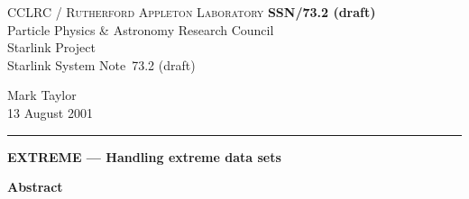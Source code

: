 \documentclass[twoside,11pt]{article}
\newcommand{\stardoccategory}  {Starlink System Note}
\newcommand{\stardocinitials}  {SSN}
\newcommand{\stardocnumber}    {73.2 (draft)}
\newcommand{\stardocauthors}   {Mark Taylor}
\newcommand{\stardocdate}      {13 August 2001}
\newcommand{\stardoctitle}     {EXTREME --- Handling extreme data sets}
\newcommand{\stardocname}{\stardocinitials /\stardocnumber}
\newenvironment{latexonly}{}{}
\renewcommand{\_}{\texttt{\symbol{95}}}
\begin{document}
\thispagestyle{empty}

\begin{latexonly}
   CCLRC / \textsc{Rutherford Appleton Laboratory} \hfill \textbf{\stardocname}\\
   {\large Particle Physics \& Astronomy Research Council}\\
   {\large Starlink Project\\}
   {\large \stardoccategory\ \stardocnumber}
   \begin{flushright}
   \stardocauthors\\
   \stardocdate
   \end{flushright}
   \vspace{-4mm}
   \rule{\textwidth}{0.5mm}
   \vspace{5mm}
   \begin{center}
   {\Large\textbf{\stardoctitle}}
   \end{center}
   \vspace{5mm}

   \vspace{10mm}
   \begin{center}
      {\Large\textbf{Abstract}}
   \end{center}
\end{latexonly}
\end{document}
